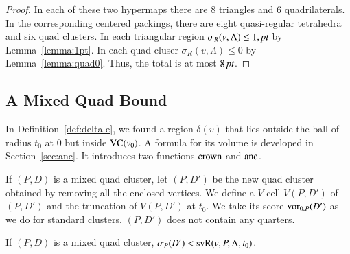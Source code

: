 \begin{proof}
In each of these two hypermaps there are $8$ triangles and
$6$ quadrilaterals.  In the corresponding centered packings,
there are  eight quasi-regular tetrahedra and six quad clusters.
In each triangular region $\sigma_R(v,\Lambda)\le 1,\hbox{\it pt}$ by Lemma~\ref{lemma:1pt}.
In each quad cluser $\sigma_R(v,\Lambda)\le 0$ by Lemma~\ref{lemma:quad0}.  
Thus, the total is
at most $8\,\hbox{\it pt}$.
\end{proof}











\subsection{A Mixed Quad Bound}%

In Definition~\ref{def:delta-e}, we found a region $\delta(v)$
that lies outside the ball of radius $t_0$ at $0$ but inside
${\operatorname{VC}}(v_0)$.  A formula for its volume is developed
in Section~\ref{sec:anc}.  It introduces two functions
$\operatorname{crown}$ and $\operatorname{anc}$.


\smallskip
If $(P,D)$ is a mixed quad cluster, let $(P,D')$ be the new quad
cluster obtained by removing all the enclosed vertices.  We define
a $V$-cell $V(P,D')$ of $(P,D')$ and the truncation of $V(P,D')$
at $t_0$. We take its score ${\operatorname{vor}}_{0,P}(D')$  as we do for
standard clusters.  $(P,D')$ does not contain any quarters.

\begin{lemma} \label{lemma:mixed-vor0}
If $(P,D)$ is a mixed quad cluster, $\sigma_P(D') <
{\operatorname{svR}}(v,P,\Lambda,t_0)$.  
\end{lemma}

